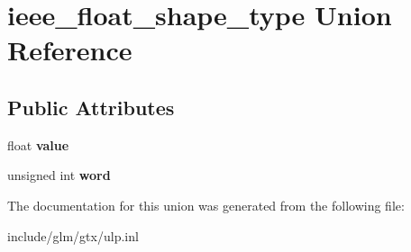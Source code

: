 \hypertarget{unionieee__float__shape__type}{\section{ieee\-\_\-float\-\_\-shape\-\_\-type \-Union \-Reference}
\label{unionieee__float__shape__type}
}
\subsection*{\-Public \-Attributes}
\begin{DoxyCompactItemize}
\item 
\hypertarget{unionieee__float__shape__type_aa0c47451f1b974421cbb9e2833ddb68e}{float {\bfseries value}}\label{unionieee__float__shape__type_aa0c47451f1b974421cbb9e2833ddb68e}

\item 
\hypertarget{unionieee__float__shape__type_a49230c21acd672d044f38b1abcbd6071}{unsigned int {\bfseries word}}\label{unionieee__float__shape__type_a49230c21acd672d044f38b1abcbd6071}

\end{DoxyCompactItemize}


\-The documentation for this union was generated from the following file\-:\begin{DoxyCompactItemize}
\item 
include/glm/gtx/ulp.\-inl\end{DoxyCompactItemize}
